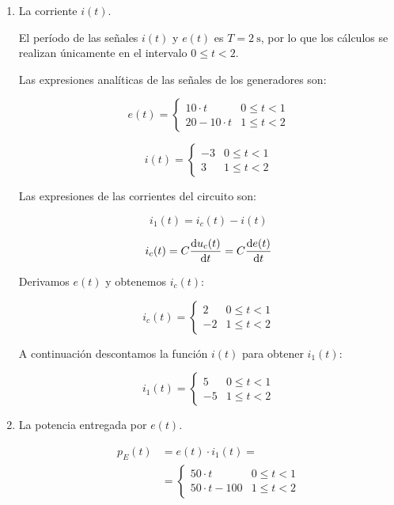 \documentclass[10pt]{article}
\begin{document}
\begin{enumerate}

\item La corriente $i(t)$.

  El período de las señales $i(t)$ y $e(t)$ es $T = \SI{2}{\second}$, por lo que los cálculos se realizan únicamente en el intervalo $0 \leq t < 2$.

Las expresiones analíticas de las señales de los generadores son:

\[
  e(t) = %
  \begin{cases}
    10\cdot t & 0 \leq t < 1\\
    20 - 10 \cdot t & 1 \leq t < 2 
  \end{cases}
\]

\[
  i(t) = %
  \begin{cases}
    -3 & 0 \leq t < 1\\
    3 & 1 \leq t < 2 
  \end{cases}
\]

Las expresiones de las corrientes del circuito son:

\[
  i_1(t) = i_c(t) - i(t)
\]

\[
  i_c(t) = C \diff{u_c(t)}{t} = C \diff{e(t)}{t}
\]



Derivamos $e(t)$ y obtenemos $i_c(t)$:

\[
  i_c(t) = %
  \begin{cases}
    2 & 0 \leq t < 1\\
    -2 & 1 \leq t < 2 
  \end{cases}
\]

A continuación descontamos la función $i(t)$ para obtener $i_1(t)$:

\[
  i_1(t) = %
  \begin{cases}
    5 & 0 \leq t < 1\\
    -5 & 1 \leq t < 2 
  \end{cases}
\]

\item La potencia entregada por $e(t)$.

  \begin{align*}
    p_E(t) &= e(t) \cdot i_1(t) = \\
           &=%
             \begin{cases}
               50\cdot t & 0 \leq t < 1\\
               50 \cdot t - 100 & 1 \leq t < 2 
             \end{cases}
  \end{align*}
  

\end{enumerate}
\end{document}
